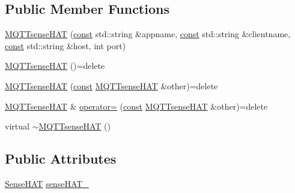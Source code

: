 \subsection*{Public Member Functions}
\begin{DoxyCompactItemize}
\item 
\hyperlink{class_m_q_t_tsense_h_a_t_aebf1fa63fff01df39062b9f8e204c094}{M\+Q\+T\+Tsense\+H\+AT} (\hyperlink{functions__c_8js_afacfd9c985d225bb07483b887a801b6f}{const} std\+::string \&appname, \hyperlink{functions__c_8js_afacfd9c985d225bb07483b887a801b6f}{const} std\+::string \&clientname, \hyperlink{functions__c_8js_afacfd9c985d225bb07483b887a801b6f}{const} std\+::string \&host, int port)
\item 
\hyperlink{class_m_q_t_tsense_h_a_t_a93e7e34b58de720b6408d7fe1c105f30}{M\+Q\+T\+Tsense\+H\+AT} ()=delete
\item 
\hyperlink{class_m_q_t_tsense_h_a_t_a6dfcdbe30dac95e0348dfdfa4b79b1d1}{M\+Q\+T\+Tsense\+H\+AT} (\hyperlink{functions__c_8js_afacfd9c985d225bb07483b887a801b6f}{const} \hyperlink{class_m_q_t_tsense_h_a_t}{M\+Q\+T\+Tsense\+H\+AT} \&other)=delete
\item 
\hyperlink{class_m_q_t_tsense_h_a_t}{M\+Q\+T\+Tsense\+H\+AT} \& \hyperlink{class_m_q_t_tsense_h_a_t_a14b36ab0892f31e920b0df90194c8810}{operator=} (\hyperlink{functions__c_8js_afacfd9c985d225bb07483b887a801b6f}{const} \hyperlink{class_m_q_t_tsense_h_a_t}{M\+Q\+T\+Tsense\+H\+AT} \&other)=delete
\item 
virtual \hyperlink{class_m_q_t_tsense_h_a_t_afa0dbb02ab0471f273fcca1afecc173c}{$\sim$\+M\+Q\+T\+Tsense\+H\+AT} ()
\end{DoxyCompactItemize}
\subsection*{Public Attributes}
\begin{DoxyCompactItemize}
\item 
\hyperlink{class_sense_h_a_t}{Sense\+H\+AT} \hyperlink{class_m_q_t_tsense_h_a_t_a50dfd49dde7594da4193b8b90f6c1048}{sense\+H\+A\+T\+\_\+}
\end{DoxyCompactItemize}
